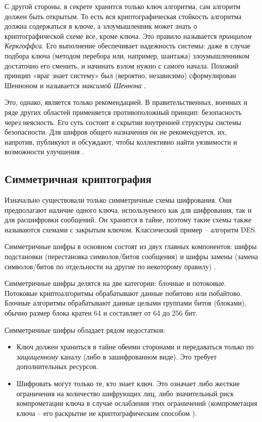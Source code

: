 С другой стороны, в секрете хранится только ключ алгоритма, сам алгоритм должен быть открытым. То есть вся криптографическая стойкость алгоритма должна содержаться в ключе, а злоумышленник может знать о криптографической схеме все, кроме ключа. Это правило называется \textit{принципом Керкгоффса}. Его выполнение обеспечивает надежность системы: даже в случае подбора ключа (методом перебора или, например, шантажа) злоумышленником достаточно его сменить, и начинать взлом нужно с самого начала. Похожий принцип «враг знает систему» был (вероятно, независимо) сформулирован Шенноном и называется \textit{максимой Шеннона} \cite{src13}.

Это, однако, является только рекомендацией. В правительственных, военных и ряде других областей применяется противоположный принцип: безопасность через неясность. Его суть состоит в скрытии внутренней структуры системы безопасности. Для шифров общего назначения он не рекомендуется, их, напротив, публикуют и обсуждают, чтобы коллективно найти уязвимости и возможности улучшения \cite{src14}.

\subsection{Симметричная криптография} %

Изначально существовали только симметричные схемы шифрования. Они предполагают наличие одного ключа, используемого как для шифрования, так и для расшифровки сообщений. Он хранится в тайне, поэтому такие схемы также называются схемами с закрытым ключом. Классический пример – алгоритм DES.

Симметричные шифры в основном состоят из двух главных компонентов: шифры подстановки (перестановка символов/битов сообщения) и шифры замены (замена символов/битов по отдельности на другие по некоторому правилу) \cite{src8}. 

Симметричные шифры делятся на две категории: блочные и потоковые. Потоковые криптоалгоритмы обрабатывают данные побитово или побайтово. Блочные алгоритмы обрабатывают данные целыми группами битов (блоками), обычно размер блока кратен 64 и составляет от 64 до 256 бит.

Симметричные шифры обладает рядом недостатков:
\begin{itemize}
	\item Ключ должен храниться в тайне обеими сторонами и передаваться только по \textit{защищенному} каналу (либо в зашифрованном виде). Это требует дополнительных ресурсов.
	\item Шифровать могут только те, кто знает ключ. Это означает либо жесткие ограничения на количество шифрующих лиц, либо значительный риск компрометации ключа в случае ослабления этих ограничений (компрометация ключа – его раскрытие не криптографическим способом \cite{src15}).
\end{itemize}

